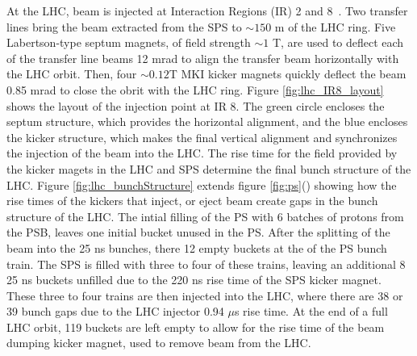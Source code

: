 \par At the LHC, beam is injected at Interaction Regions (IR) 2 and
8~\cite{lhc:machine_description}.  Two transfer lines bring the beam
extracted from the SPS to $\sim150$ m of the LHC ring.  Five
Labertson-type septum magnets, of field strength $\sim1$ T, are used
to deflect each of the transfer line beams 12 mrad to align the
transfer beam horizontally with the LHC orbit.  Then, four $\sim0.12$T
MKI kicker magnets quickly deflect the beam 0.85 mrad to close the
obrit with the LHC ring.  Figure \ref{fig:lhc_IR8_layout} shows the
layout of the injection point at IR 8.  The green circle encloses the
septum structure, which provides the horizontal alignment, and the
blue encloses the kicker structure, which makes the final vertical
alignment and synchronizes the injection of the beam into the LHC.
The rise time for the field provided by the kicker magets in the LHC
and SPS determine the final bunch structure of the LHC.  Figure
\ref{fig:lhc_bunchStructure} extends figure
\ref{fig:ps}() showing how the rise times of
the kickers that inject, or eject beam create gaps in the bunch
structure of the LHC.  The intial filling of the PS with 6 batches of
protons from the PSB, leaves one initial bucket unused in the PS.
After the splitting of the beam into the 25 ns bunches, there 12 empty
buckets at the of the PS bunch train.  The SPS is filled with three to
four of these trains, leaving an additional 8 25 ns buckets unfilled
due to the 220 ns rise time of the SPS kicker magnet. These three to
four trains are then injected into the LHC, where there are 38 or 39
bunch gaps due to the LHC injector 0.94 $\mu$s rise time.  At the end
of a full LHC orbit, 119 buckets are left empty to allow for the rise
time of the beam dumping kicker magnet, used to remove beam from the
LHC.     

